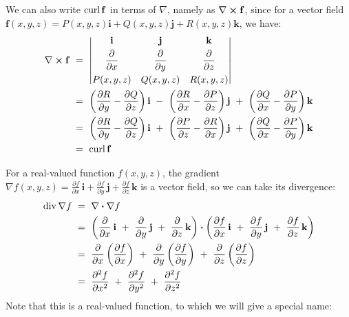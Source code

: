We can also write $\mathop{\mathrm{curl}}\nolimits\mathbf{f}$ in terms of $\nabla$, namely as $\nabla \bm{\times} \mathbf{f}$, since
for a vector field $\mathbf{f}(x,y,z) = P(x,y,z)\mathbf{i} + Q(x,y,z)\mathbf{j} + R(x,y,z)\mathbf{k}$, we have:
\begin{align*}
 \Crossprod{\nabla}{\mathbf{f}} ~&=~
 \begin{vmatrix}
  \mathbf{i} & \mathbf{j} & \mathbf{k} \smallskip\\ \dfrac{\partial}{\partial x} & \dfrac{\partial}{\partial y} &
   \dfrac{\partial}{\partial z} \smallskip\\
  P(x,y,z) & Q(x,y,z) & R(x,y,z)
 \end{vmatrix}\\
 &=~ \left( \frac{\partial R}{\partial y} - \frac{\partial Q}{\partial z} \right) \mathbf{i} ~-~
    \left( \frac{\partial R}{\partial x} - \frac{\partial P}{\partial z} \right) \mathbf{j} ~+~
    \left( \frac{\partial Q}{\partial x} - \frac{\partial P}{\partial y} \right) \mathbf{k}\\
 &=~ \left( \frac{\partial R}{\partial y} - \frac{\partial Q}{\partial z} \right) \mathbf{i} ~+~
    \left( \frac{\partial P}{\partial z} - \frac{\partial R}{\partial x} \right) \mathbf{j} ~+~
    \left( \frac{\partial Q}{\partial x} - \frac{\partial P}{\partial y} \right) \mathbf{k}\\
 &=~ \curl\mathbf{f}
\end{align*}

For a real-valued function $f(x,y,z)$, the gradient $\nabla f(x,y,z) =\frac{\partial f}{\partial x}\,\mathbf{i} +
\frac{\partial f}{\partial y}\,\mathbf{j} + \frac{\partial f}{\partial z}\,\mathbf{k}$ is a vector field, so we
can take its divergence:
\begin{align*}
 \mathop{\mathrm{div}}\nolimits\nabla f ~&=~ \nabla \bm{\cdot} \nabla f\\
  &=~ \left( \frac{\partial}{\partial x}\,\mathbf{i} ~+~ \frac{\partial}{\partial y}\,\mathbf{j} ~+~
  \frac{\partial}{\partial z}\,\mathbf{k} \right)  \bm{\cdot} \left( \frac{\partial f}{\partial x}\,\mathbf{i} ~+~
  \frac{\partial f}{\partial y}\,\mathbf{j} ~+~ \frac{\partial f}{\partial z}\,\mathbf{k} \right)\\
  &=~ \frac{\partial}{\partial x}\left( \frac{\partial f}{\partial x} \right) ~+~
   \frac{\partial}{\partial y}\left( \frac{\partial f}{\partial y} \right) ~+~
   \frac{\partial}{\partial z}\left( \frac{\partial f}{\partial z} \right)\\
  &=~ \frac{\partial^2 f}{\partial x^2} ~+~ \frac{\partial^2 f}{\partial y^2} ~+~ \frac{\partial^2 f}{\partial z^2}
\end{align*}
Note that this is a real-valued function, to which we will give a special name:

